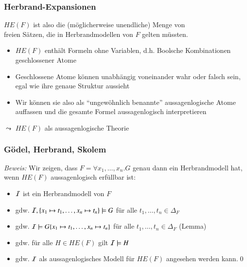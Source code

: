 \documentclass[onlymath]{beamer}
\begin{document}
\begin{frame}\frametitle{Herbrand-Expansionen}


$HE(F)$ ist also die (möglicherweise unendliche) Menge von \\ freien Sätzen, die in Herbrandmodellen von $F$ gelten müssten.
\pause\bigskip

\begin{itemize}
\item $HE(F)$ enthält Formeln ohne Variablen, d.h. Boolsche Kombinationen geschlossener Atome
\item Geschlossene Atome können unabhängig voneinander wahr oder falsch sein, egal wie ihre genaue Struktur aussieht
\item Wir können sie also als "`ungewöhnlich benannte"' aussagenlogische Atome auffassen und die gesamte Formel aussagenlogisch interpretieren
\end{itemize}
\alert{$\leadsto$ $HE(F)$ als aussagenlogische Theorie}


\end{frame}

\begin{frame}\frametitle{Gödel, Herbrand, Skolem}

\pause

\emph{Beweis:} Wir zeigen, dass $F=\forall x_1,\ldots,x_n.G$ genau dann ein Herbrandmodell hat, wenn $HE(F)$ aussagenlogisch erfüllbar ist:\pause

\begin{itemize}
\item $\mathcal{I}$ ist ein Herbrandmodell von $F$\pause
\item gdw. $\mathcal{I},\{x_1\mapsto t_1,\ldots,x_n\mapsto t_n\}\models G$ für alle $t_1,\ldots,t_n\in\Delta_F$\pause
\item gdw. $\mathcal{I}\models G\{x_1\mapsto t_1,\ldots,x_n\mapsto t_n\}$ für alle $t_1,\ldots,t_n\in\Delta_F$ (Lemma)\pause
\item gdw. für alle $H\in HE(F)$ gilt $\mathcal{I}\models H$\pause
\item gdw. $\mathcal{I}$ als aussagenlogisches Modell für $HE(F)$ angesehen werden kann.\qed
\end{itemize}

\end{frame}
\end{document}
